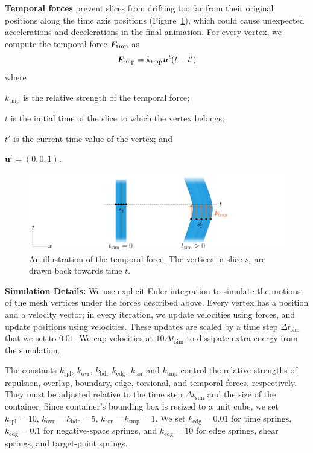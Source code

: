 \newtext
{
\textbf{Temporal forces} prevent slices from drifting too far
from their original positions along the time axis positions
(Figure~\ref{fig_animationpak_t_force}), which could cause unexpected accelerations
and decelerations in the final animation.  For every vertex, we compute
the temporal force $\bm{F}_\mathrm{tmp}$ as
\begin{equation}
\bm{F}_\mathrm{tmp} = k_\mathrm{tmp} \bm{u}^t(t - t')
\end{equation}
where
\begin{packeddescriptions}
  \item[$k_\mathrm{tmp}$] is the relative strength of the temporal force;
  \item[$t$] is the initial time of the slice to which the vertex belongs;
  \item[$t'$] is the current time value of the vertex; and
  \item[$\bm{u}^t = (0,0,1)$.]
\end{packeddescriptions}
}

\begin{figure}
\centering
\includegraphics[width=1.0\textwidth]{figures/animationpak/t_force.pdf} 
\caption[An illustration of the temporal forces]
{\label{fig_animationpak_t_force} 
An illustration of the temporal force.  The vertices in slice
$s_i$ are drawn back towards time $t$.
}
\end{figure}

\newtext
{
\textbf{Simulation Details:}
We use explicit Euler integration to simulate the motions of the mesh vertices under the
forces described above.  Every vertex has a position and a velocity vector; in
every iteration, we update velocities using forces, and update positions using
velocities.  These updates are scaled by a time step 
$\Delta t_\mathrm{sim}$ that we set to $0.01$.
We cap velocities at $10 \Delta t_\mathrm{sim}$ 
to dissipate extra energy from the simulation.
}

\newtext
{
The constants $k_\mathrm{rpl}$, $k_\mathrm{ovr}$, $k_\mathrm{bdr}$  $k_\mathrm{edg}$, $k_\mathrm{tor}$ 
and $k_\mathrm{tmp}$ control the relative strengths
of repulsion, overlap, boundary, edge, torsional, and temporal forces, respectively.
They must be adjusted relative to the time step $\Delta t_\mathrm{sim}$ and the size of the container.
Since container's bounding box is resized to a unit cube,
we set $k_\mathrm{rpl}=10$, $k_\mathrm{ovr}=k_\mathrm{bdr}=5$, $k_\mathrm{tor}=k_\mathrm{tmp}=1$.
We set $k_\mathrm{edg} = 0.01$ for time springs,
$k_\mathrm{edg} = 0.1$ for negative-space springs, and $k_\mathrm{edg} = 10$ for edge springs, shear springs,
and target-point springs.
}





